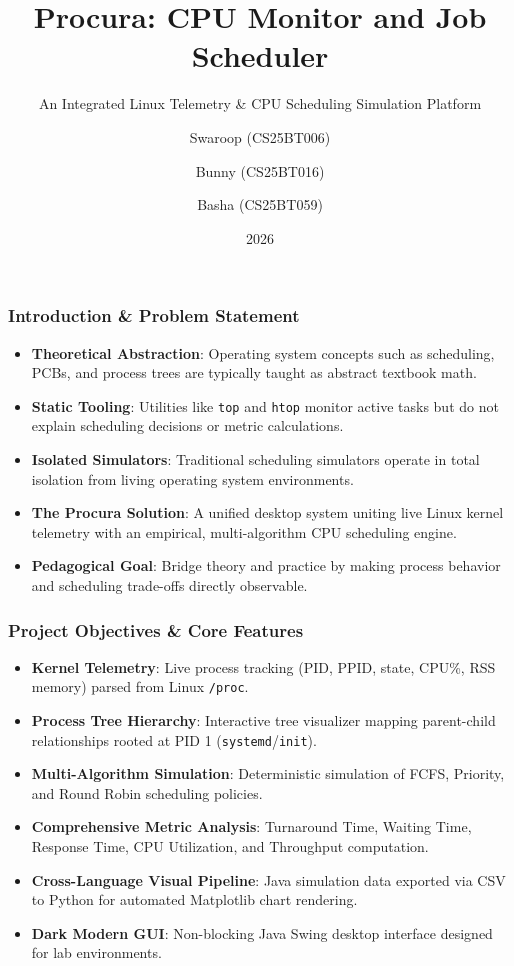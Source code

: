 \documentclass[aspectratio=169,10pt]{beamer}
\title[Procura — CPU Monitor \& Scheduler]{\textbf{Procura: CPU Monitor and Job Scheduler}}
\subtitle{An Integrated Linux Telemetry \& CPU Scheduling Simulation Platform}
\author[Swaroop, Bunny, Basha]{
  Swaroop (CS25BT006) \and Bunny (CS25BT016) \and Basha (CS25BT059)
}
\institute[BTech CSE]{
  Department of Computer Science and Engineering\\
  B.Tech Operating Systems Laboratory Project
}
\date{2026}
\begin{document}
\begin{frame}
  \titlepage
\end{frame}

\begin{frame}
  \frametitle{Introduction \& Problem Statement}
  \begin{itemize}
    \item \textbf{Theoretical Abstraction}: Operating system concepts such as scheduling, PCBs, and process trees are typically taught as abstract textbook math.
    \item \textbf{Static Tooling}: Utilities like \texttt{top} and \texttt{htop} monitor active tasks but do not explain scheduling decisions or metric calculations.
    \item \textbf{Isolated Simulators}: Traditional scheduling simulators operate in total isolation from living operating system environments.
    \item \textbf{The Procura Solution}: A unified desktop system uniting live Linux kernel telemetry with an empirical, multi-algorithm CPU scheduling engine.
    \item \textbf{Pedagogical Goal}: Bridge theory and practice by making process behavior and scheduling trade-offs directly observable.
  \end{itemize}
\end{frame}

\begin{frame}
  \frametitle{Project Objectives \& Core Features}
  \begin{itemize}
    \item \textbf{Kernel Telemetry}: Live process tracking (PID, PPID, state, CPU\%, RSS memory) parsed from Linux \texttt{/proc}.
    \item \textbf{Process Tree Hierarchy}: Interactive tree visualizer mapping parent-child relationships rooted at PID 1 (\texttt{systemd}/\texttt{init}).
    \item \textbf{Multi-Algorithm Simulation}: Deterministic simulation of FCFS, Priority, and Round Robin scheduling policies.
    \item \textbf{Comprehensive Metric Analysis}: Turnaround Time, Waiting Time, Response Time, CPU Utilization, and Throughput computation.
    \item \textbf{Cross-Language Visual Pipeline}: Java simulation data exported via CSV to Python for automated Matplotlib chart rendering.
    \item \textbf{Dark Modern GUI}: Non-blocking Java Swing desktop interface designed for lab environments.
  \end{itemize}
\end{frame}
\end{document}
